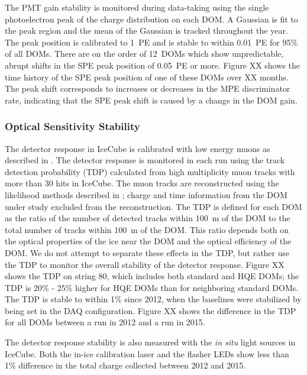 The PMT gain stability is monitored during data-taking using the
single photoelectron peak of the charge distribution on each DOM. A
Gaussian is fit to the peak region and the mean of the Gaussian is
tracked throughout the year. The peak position is calibrated to 1~PE
and is stable to within 0.01~PE for 95\% of all DOMs. There are on the
order of 12~DOMs which show unpredictable, abrupt shifts in the SPE peak
position of 0.05~PE or more. Figure XX shows the time history of the
SPE peak position of one of these DOMs over XX months. The peak shift
corresponds to increases or decreases in the MPE discriminator rate,
indicating that the SPE peak shift is caused by a change in the DOM
gain. 

\subsubsection{Optical Sensitivity Stability}

The detector response in IceCube is calibrated with low energy muons as
described in \cite{IC3:ereco}. The detector response is monitored in each run using the track
detection probability (TDP) calculated from high
multiplicity muon tracks with more than 30 hits in IceCube. The muon
tracks are reconstructed using the likelihood methods described in
\cite{IC3:ereco}; charge and time information from the DOM under study excluded
from the reconstruction. The TDP is
defined for each DOM as the ratio of the number of detected tracks
within 100~m of the DOM to the total number of tracks within 100~m of
the DOM. This ratio depends both on the optical properties of the ice
near the DOM and the optical efficiency of the DOM. We do not attempt
to separate
these effects in the TDP, but rather use the TDP to monitor the
overall stability of the detector response. Figure XX shows the TDP on
string 80, which includes both standard and HQE DOMs; the TDP is
20\% - 25\% higher for HQE DOMs than for neighboring standard
DOMs. The TDP is stable to within 1\% since 2012, when the baselines
were stabilized by being set in the DAQ configuration. Figure XX shows
the difference in the TDP for all DOMs between a run in 2012 and a run
in 2015.

The detector response stability is also measured with the {\it in
  situ} light sources in IceCube. Both the in-ice calibration laser
\cite{IC3:SC} and the flasher LEDs show less than 1\% difference in the total
charge collected between 2012 and 2015. 

